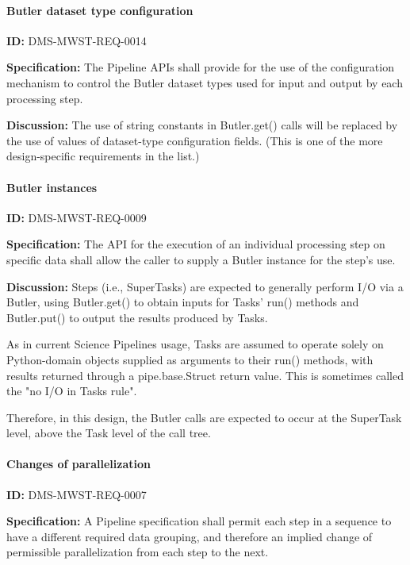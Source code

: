 \documentclass[SE,toc,lsstdraft]{lsstdoc}
\begin{document}
\paragraph{Butler dataset type configuration}\hfill  %

\label{DMS-MWST-REQ-0014}
\textbf{ID:} DMS-MWST-REQ-0014

\textbf{Specification:}
The Pipeline APIs shall provide for the use of the configuration mechanism to control the Butler dataset types used for input and output by each processing step.

\textbf{Discussion:}
The use of string constants in Butler.get() calls will be replaced by the use of values of dataset-type configuration fields. (This is one of the more design-specific requirements in the list.)

\paragraph{Butler instances}\hfill  %

\label{DMS-MWST-REQ-0009}
\textbf{ID:} DMS-MWST-REQ-0009

\textbf{Specification:}
The API for the execution of an individual processing step on specific data shall allow the caller to supply a Butler instance for the step's use.

\textbf{Discussion:}
Steps (i.e., SuperTasks) are expected to generally perform I/O via a Butler, using Butler.get() to obtain inputs for Tasks' run() methods and Butler.put() to output the results produced by Tasks.

As in current Science Pipelines usage, Tasks are assumed to operate solely on Python-domain objects supplied as arguments to their run() methods, with results returned through a pipe.base.Struct return value. This is sometimes called the "no I/O in Tasks rule".

Therefore, in this design, the Butler calls are expected to occur at the SuperTask level, above the Task level of the call tree.

\paragraph{Changes of parallelization}\hfill  %

\label{DMS-MWST-REQ-0007}
\textbf{ID:} DMS-MWST-REQ-0007

\textbf{Specification:}
A Pipeline specification shall permit each step in a sequence to have a different required data grouping, and therefore an implied change of permissible parallelization from each step to the next.
\end{document}
